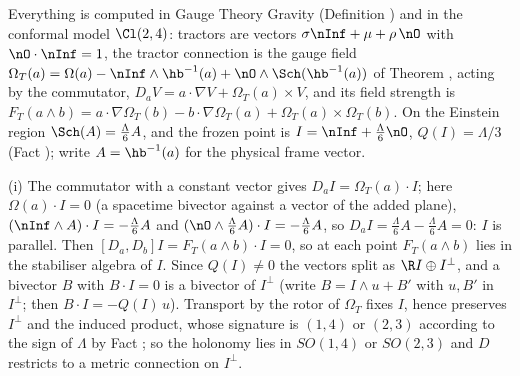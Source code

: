Everything is computed in Gauge Theory Gravity (Definition ) and in the conformal model $\Cl(2,4)$: tractors are vectors $\sigma\nInf + \mu + \rho\,\nO$ with $\nO\cdot\nInf = 1$, the tractor connection is the gauge field $\Omega_{T}(a) = \Omega(a) - \nInf\wedge\hb^{-1}(a) + \nO\wedge\Sch(\hb^{-1}(a))$ of Theorem , acting by the commutator, $D_{a}V = a\cdot\nabla V + \Omega_{T}(a)\times V$, and its field strength is $F_{T}(a\wedge b) = a\cdot\nabla\Omega_{T}(b) - b\cdot\nabla\Omega_{T}(a) + \Omega_{T}(a)\times\Omega_{T}(b)$. On the Einstein region $\Sch(A) = \tfrac{\Lambda}{6}A$, and the frozen point is $I = \nInf + \tfrac{\Lambda}{6}\nO$, $Q(I) = \Lambda/3$ (Fact ); write $A = \hb^{-1}(a)$ for the physical frame vector.

(i) The commutator with a constant vector gives $D_{a}I = \Omega_{T}(a)\cdot I$; here $\Omega(a)\cdot I = 0$ (a spacetime bivector against a vector of the added plane), $(\nInf\wedge A)\cdot I = -\tfrac{\Lambda}{6}A$ and $(\nO\wedge\tfrac{\Lambda}{6}A)\cdot I = -\tfrac{\Lambda}{6}A$, so $D_{a}I = \tfrac{\Lambda}{6}A - \tfrac{\Lambda}{6}A = 0$: $I$ is parallel. Then $[D_{a}, D_{b}]I = F_{T}(a\wedge b)\cdot I = 0$, so at each point $F_{T}(a\wedge b)$ lies in the stabiliser algebra of $I$. Since $Q(I) \neq 0$ the vectors split as $\R I \oplus I^{\perp}$, and a bivector $B$ with $B\cdot I = 0$ is a bivector of $I^{\perp}$ (write $B = I\wedge u + B'$ with $u, B'$ in $I^{\perp}$; then $B\cdot I = -Q(I)\,u$). Transport by the rotor of $\Omega_{T}$ fixes $I$, hence preserves $I^{\perp}$ and the induced product, whose signature is $(1,4)$ or $(2,3)$ according to the sign of $\Lambda$ by Fact ; so the holonomy lies in $SO(1,4)$ or $SO(2,3)$ and $D$ restricts to a metric connection on $I^{\perp}$.

